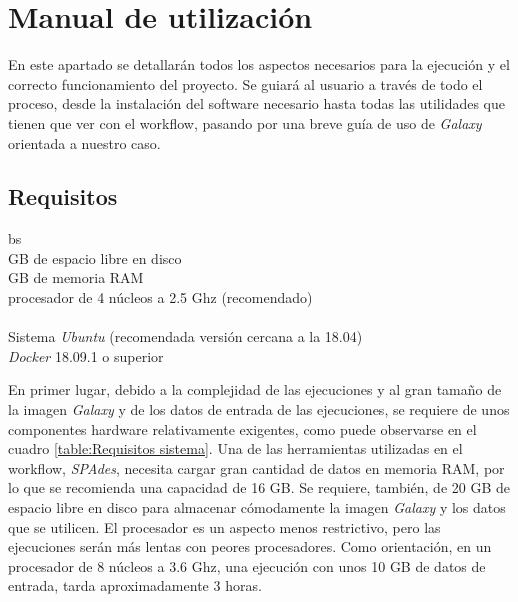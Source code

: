 \chapter{Manual de utilización}
\label{Anexo:manualuso}
En este apartado se detallarán todos los aspectos necesarios para la ejecución y el correcto funcionamiento del proyecto. Se guiará al usuario a través de todo el proceso, desde la instalación del software necesario hasta todas las utilidades que tienen que ver con el workflow, pasando por una breve guía de uso de \textit{Galaxy} orientada a nuestro caso.
\section{Requisitos}

\begin{table}[!h]

\begin{center}
\begin{tabularx}{\textwidth}{bs}
\hline
{}\\
 GB de espacio libre en disco \\

 GB de memoria RAM \\

\quad procesador de 4 núcleos a 2.5 Ghz (recomendado) \\

\hline
{} \\
\quad Sistema \textit{Ubuntu} (recomendada versión cercana a la 18.04) \\

\quad \textit{Docker} 18.09.1 o superior\\

\hline

\end{tabularx}
\end{center}
\caption{Requisitos del sistema}
\label{table:Requisitos sistema}
\end{table}
En primer lugar, debido a la complejidad de las ejecuciones y al gran tamaño de la imagen \textit{Galaxy} y de los datos de entrada de las ejecuciones, se requiere de unos componentes hardware relativamente exigentes, como puede observarse en el cuadro \ref{table:Requisitos sistema}. Una de las herramientas utilizadas en el workflow, \textit{SPAdes}, necesita cargar gran cantidad de datos en memoria RAM, por lo que se recomienda una capacidad de 16 GB. Se requiere, también, de 20 GB de espacio libre en disco para almacenar cómodamente la imagen \textit{Galaxy} y los datos que se utilicen. El procesador es un aspecto menos restrictivo, pero las ejecuciones serán más lentas con peores procesadores. Como orientación, en un procesador de 8 núcleos a 3.6 Ghz, una ejecución con unos 10 GB de datos de entrada, tarda aproximadamente 3 horas.

